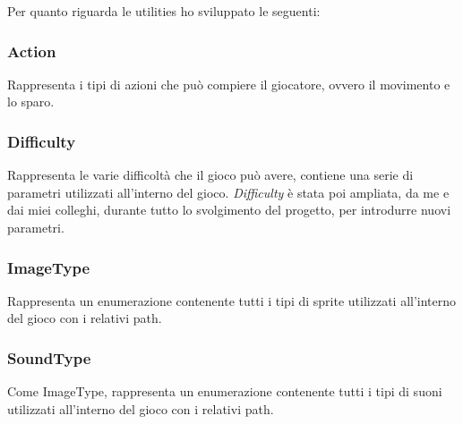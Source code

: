 Per quanto riguarda le utilities ho sviluppato le seguenti:

\subsubsection{Action}
Rappresenta i tipi di azioni che può compiere il giocatore, ovvero il movimento e lo sparo.

\subsubsection{Difficulty}
Rappresenta le varie difficoltà che il gioco può avere, contiene una serie di parametri utilizzati all'interno del gioco. \textit{Difficulty} è stata poi ampliata, da me e dai miei colleghi, durante tutto lo svolgimento del progetto, per introdurre nuovi parametri.

\subsubsection{ImageType}
Rappresenta un enumerazione contenente tutti i tipi di sprite utilizzati all'interno del gioco con i relativi path.

\subsubsection{SoundType}
Come ImageType, rappresenta un enumerazione contenente tutti i tipi di suoni utilizzati all'interno del gioco con i relativi path.